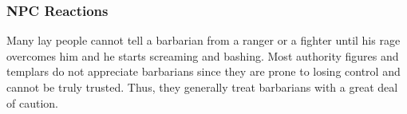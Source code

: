 \subsubsection{NPC Reactions}
Many lay people cannot tell a barbarian from a ranger or a fighter until his rage overcomes him and he starts screaming and bashing. Most authority figures and templars do not appreciate barbarians since they are prone to losing control and cannot be truly trusted. Thus, they generally treat barbarians with a great deal of caution.




